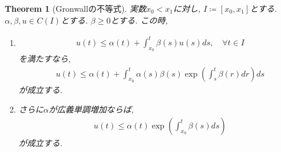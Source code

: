 \documentclass{ltjsarticle}
\newtheorem{theorem}{Theorem}
\begin{document}
\begin{theorem}[Gronwallの不等式]
  実数$x_0<x_1$に対し,  $I \coloneqq [x_0,x_1]$とする.  $\alpha ,\beta , u \in C(I)$とする.  $\beta \geq 0$とする. 
  この時, 
  \begin{enumerate}
    \item  \begin{equation}
      \begin{aligned}
        u(t) \leq \alpha (t) + \int_{x_0}^t \beta (s)u(s) ds, \quad \forall t \in I
      \end{aligned}
    \end{equation} 
    を満たすなら, 
    \begin{equation}
      \begin{aligned}
        u(t) \leq \alpha (t) + \int_{x_0}^t \alpha (s)\beta (s) \exp \left( \int_s^t \beta (r) dr \right) ds
      \end{aligned}
    \end{equation} 
    が成立する. 
  \item さらに$\alpha $が広義単調増加ならば,  
    \begin{equation}
      \begin{aligned}
        u(t) \leq \alpha (t) \exp \left( \int_{x_0}^t \beta (s) ds \right) 
      \end{aligned}
    \end{equation} 
    が成立する. 
  \end{enumerate} 
\end{theorem}
   
\end{document}
